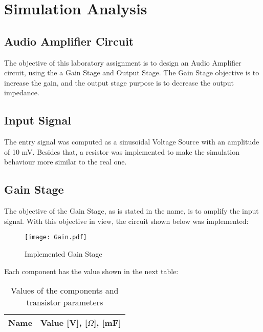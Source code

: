 \newpage
\section{Simulation Analysis}
\label{sec:simulation}


\subsection{Audio Amplifier Circuit}

The objective of this laboratory assignment is to design an Audio Amplifier circuit, using the a Gain Stage and Output Stage. The Gain Stage objective is to increase the gain, and the output stage purpose is to decrease the output impedance.




\subsection{Input Signal}

The entry signal was computed as a sinusoidal Voltage Source with an amplitude of 10 mV. Besides that, a resistor was implemented to make the simulation behaviour more similar to the real one.



\subsection{Gain Stage}

The objective of the Gain  Stage, as is stated in the name, is to amplify the input signal. With this objective in view, the circuit shown below was implemented: 


\begin{figure}[H] \centering
\texttt{[image: Gain.pdf]}
\caption{Implemented Gain Stage}
\label{fig:gain}
\end{figure}
\vspace{1in}
Each component has the value shown in the next table:



\begin{table}[H]
  \centering
  \begin{tabular}{|l|r|}
    \hline    
    {\bf Name} & {\bf Value [V], [$\Omega$], [mF]} \\ \hline
    
  \end{tabular}
  \caption{Values of the components and  transistor parameters}
  \label{tab:r}
\end{table}
\vspace{0.3in}

